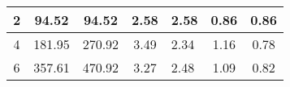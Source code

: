 \begin{table}
{\begin{tabular}{|c|c|c|c|l|c|c|}
2                                                                                          & 94.52                                                                                                                                                                                                                       & 94.52                                                                                                                                                                                                                      & 2.58                                                                                                                     & 2.58                                                                                                                                              & 0.86                                                                                & 0.86                                                                                   \\ \hline
4                                                                                          & 181.95                                                                                                                                                                                                                       & 270.92                                                                                                                                                                                                                      & 3.49                                                                                                                     & 2.34                                                                                                                                              & 1.16                                                                                & 0.78                                                                                   \\ \hline
6                                                                                          & 357.61                                                                                                                                                                                                                        & 470.92                                                                                                                                                                                                                      & 3.27                                                                                                                     & 2.48                                                                                                                                              & 1.09                                                                                & 0.82                                                                                   \\ \hline

\end{tabular}}
\end{table}
